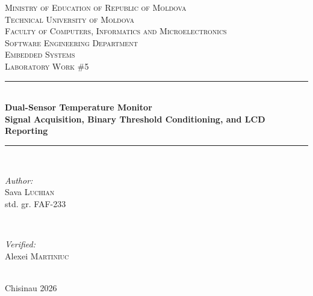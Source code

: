 \documentclass[12pt]{article}
\begin{document}
\begin{titlepage}
  \begin{center}
    \textsc{\large Ministry of Education of Republic of Moldova}\\[0.5cm]
    \textsc{\large Technical University of Moldova}\\[0.5cm]
    \textsc{\large Faculty of Computers, Informatics and Microelectronics}\\[0.5cm]
    \textsc{\large Software Engineering Department}\\[1.2cm]

    \vspace{20mm}
    \textsc{\Large Embedded Systems}\\[0.5cm]
    \textsc{\large Laboratory Work \#5}\\[0.5cm]

    \newcommand{\HRule}{\rule{\linewidth}{0.5mm}}
    \vspace{8mm}
    \HRule\\[0.4cm]
    {\LARGE \bfseries Dual-Sensor Temperature Monitor\\[0.2cm]
    \large Signal Acquisition, Binary Threshold Conditioning, and LCD Reporting\\[0.3cm]}
    \HRule\\[1.5cm]

    \begin{minipage}[t]{0.45\textwidth}
      \begin{flushleft}\large
        \emph{Author:}\\
        Sava \textsc{Luchian}\\
        std. gr. FAF-233
      \end{flushleft}
    \end{minipage}
    ~
    \begin{minipage}[t]{0.45\textwidth}
      \begin{flushright}\large
        \emph{Verified:}\\
        Alexei \textsc{Martiniuc}\\
      \end{flushright}
    \end{minipage}\\[2.5cm]

    \large Chisinau 2026
    \vfill
  \end{center}
\end{titlepage}
\end{document}
